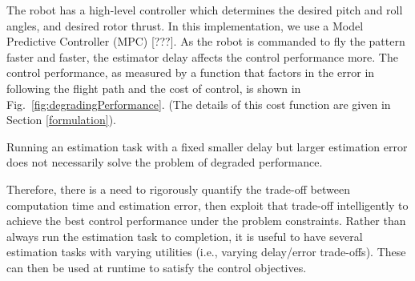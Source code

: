 The robot has a high-level controller which determines the desired pitch and roll angles, and desired rotor thrust.
In this implementation, we use a Model Predictive Controller (MPC) [???].
As the robot is commanded to fly the pattern faster and faster, the estimator delay affects the control performance more.
The control performance, as measured by a function that factors in the error in following the flight path and the cost of control, is shown in Fig.~\ref{fig:degradingPerformance}.
(The details of this cost function are given in Section \ref{formulation}).

Running an estimation task with a fixed smaller delay but larger estimation error does not necessarily solve the problem of degraded performance.

Therefore, there is a need to rigorously quantify the trade-off between computation time and estimation error, then exploit that trade-off intelligently to achieve the best control performance under the problem constraints.
Rather than always run the estimation task to completion, it is useful to have several estimation tasks with varying utilities (i.e., varying delay/error trade-offs).
These can then be used at runtime to satisfy the control objectives.
